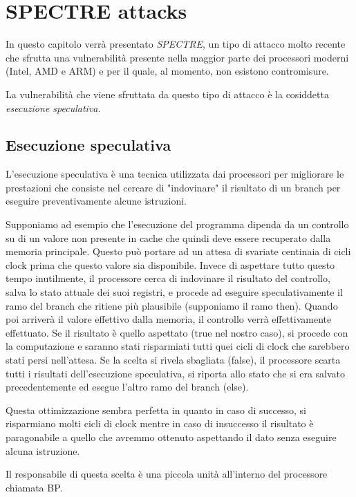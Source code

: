 \chapter{SPECTRE attacks}
	In questo capitolo verrà presentato \emph{SPECTRE}\cite{kocher2018spectre}, un tipo di attacco molto recente che sfrutta una vulnerabilità presente nella maggior parte dei processori moderni (Intel, AMD e ARM) e per il quale, al momento, non esistono contromisure.
	
	La vulnerabilità che viene sfruttata da questo tipo di attacco è la cosiddetta \emph{esecuzione speculativa}.
	
	\section{Esecuzione speculativa}
		L'esecuzione speculativa è una tecnica utilizzata dai processori per migliorare le prestazioni che consiste nel cercare di "indovinare" il risultato di un branch per eseguire preventivamente alcune istruzioni.
		
		Supponiamo ad esempio che l'esecuzione del programma dipenda da un controllo su di un valore non presente in cache che quindi deve essere recuperato dalla memoria principale. Questo può portare ad un attesa di svariate centinaia di cicli clock prima che questo valore sia disponibile. Invece di aspettare tutto questo tempo inutilmente, il processore cerca di indovinare il risultato del controllo, salva lo stato attuale dei suoi registri, e procede ad eseguire speculativamente il ramo del branch che ritiene più plausibile (supponiamo il ramo then). Quando poi arriverà il valore effettivo dalla memoria, il controllo verrà effettivamente effettuato. Se il risultato è quello aspettato (true nel nostro caso), si procede con la computazione e saranno stati risparmiati tutti quei cicli di clock che sarebbero stati persi nell'attesa. Se la scelta si rivela sbagliata (false), il processore scarta tutti i risultati dell'esecuzione speculativa, si riporta allo stato che si era salvato precedentemente ed esegue l'altro ramo del branch (else).
		
		Questa ottimizzazione sembra perfetta in quanto in caso di successo, si risparmiano molti cicli di clock mentre in caso di insuccesso il risultato è paragonabile a quello che avremmo ottenuto aspettando il dato senza eseguire alcuna istruzione.
		
		Il responsabile di questa scelta è una piccola unità all'interno del processore chiamata \ac{BP}.
		
